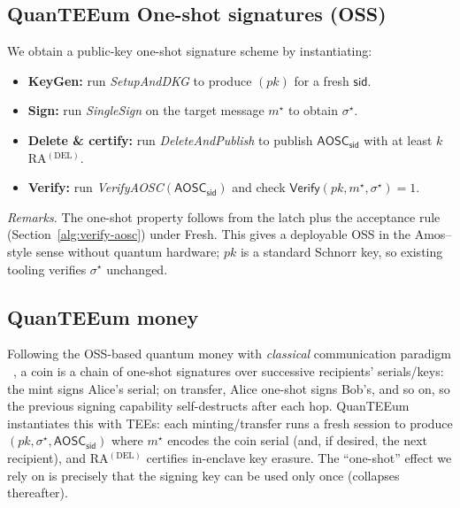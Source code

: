 \documentclass[runningheads,orivec]{llncs}
\newcommand{\prot}{\textsf{QuanTEEum}}
\newcommand{\sid}{\mathsf{sid}}
\begin{document}
\subsection{\prot{} One-shot signatures (OSS)}\label{sec:app-oss}
We obtain a public-key one-shot signature scheme by instantiating:
\begin{itemize}[leftmargin=*,itemsep=0.25em]
  \item \textbf{KeyGen:} run \emph{SetupAndDKG} to produce $(pk)$ for a fresh $\sid$.
  \item \textbf{Sign:} run \emph{SingleSign} on the target message $m^{\star}$ to obtain $\sigma^{\star}$.
  \item \textbf{Delete \& certify:} run \emph{DeleteAndPublish} to publish $\mathsf{AOSC}_\sid$ with at least $k$ RA$^{(\mathrm{DEL})}$.
  \item \textbf{Verify:} run \emph{VerifyAOSC}$(\mathsf{AOSC}_\sid)$ and check $\mathsf{Verify}(pk,m^{\star},\sigma^{\star}){=}1$.
\end{itemize}
\emph{Remarks.} The one-shot property follows from the latch plus the acceptance rule (Section~\ref{alg:verify-aosc}) under \textsf{Fresh}. This gives a deployable OSS in the Amos–style sense without quantum hardware; $pk$ is a standard Schnorr key, so existing tooling verifies $\sigma^{\star}$ unchanged.

\subsection{QuanTEEum money}
Following the OSS-based quantum money with \emph{classical} communication paradigm ~\cite{shmueli2025one}, a coin is a chain of one-shot signatures over successive recipients’ serials/keys: the mint signs Alice’s serial; on transfer, Alice one-shot signs Bob’s, and so on, so the previous signing capability self-destructs after each hop. \prot{} instantiates this with TEEs: each minting/transfer runs a fresh session to produce $(pk,\sigma^{\star},\mathsf{AOSC}_\sid)$ where $m^{\star}$ encodes the coin serial (and, if desired, the next recipient), and RA$^{(\mathrm{DEL})}$ certifies in-enclave key erasure. The “one-shot” effect we rely on is precisely that the signing key can be used only once (collapses thereafter).
\end{document}
